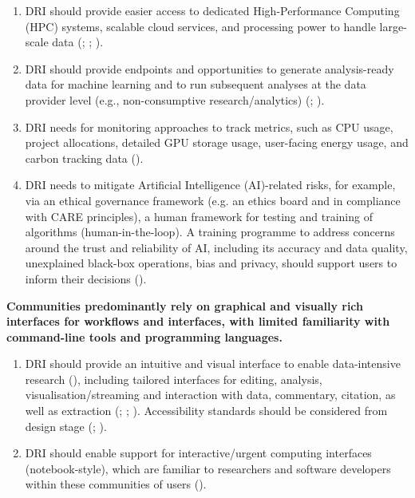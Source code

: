 \documentclass[11pt]{scrartcl}
\begin{document}
\begin{enumerate}[resume]
\item\label{itm:hpc} DRI should provide easier access to dedicated High-Performance Computing (HPC) systems, scalable cloud services, and processing power to handle large-scale data
(\cite[62]{de_roure_2022_4716148}; \cite[2]{bell_2025_17099176}; 
\cite[72]{shoaib_sufi_2023_7686348}).   

\item\label{itm:ana} DRI should provide endpoints and opportunities to generate analysis-ready data for machine learning and to run subsequent analyses at the data provider level (e.g., non-consumptive research/analytics) 
(\cite[4,66]{de_roure_2022_4716148}; \cite[5]{wrro203045}).

\item DRI needs for monitoring approaches to track metrics, such as CPU usage, project allocations, detailed GPU storage usage, user-facing energy usage, and carbon tracking data 
(\cite[14,15]{collier25}).  

\item\label{itm:aigov} DRI needs to mitigate Artificial Intelligence (AI)-related risks, for example, via an ethical governance framework (e.g. an ethics board and in compliance with CARE principles), a human framework for testing and training of algorithms (human-in-the-loop). A training programme to address concerns around the trust and reliability of AI, including its accuracy and data quality, unexplained black-box operations, bias and privacy, should support users to inform their decisions (\cite[4]{Zwiggelaar22}).   
\end{enumerate}

\noindent\textbf{Communities predominantly rely on graphical and visually rich interfaces for workflows and interfaces, with limited familiarity with command-line tools and programming languages.}

\begin{enumerate}[resume]
\item DRI should provide an intuitive and visual interface to enable data-intensive research 
(\cite[4]{wrro203045}), 
including tailored interfaces for editing, analysis, visualisation/streaming and interaction with data, commentary, citation, as well as extraction (\cite{Rodriguez22}; \cite[44]{de_roure_2022_4716148}; \cite[5]{wrro203045}). 
Accessibility standards should be considered from design stage
(\cite[66]{de_roure_2022_4716148}; \cite[5]{wrro203045}).  

\item DRI should enable support for interactive/urgent computing interfaces (notebook-style), which are familiar to researchers and software developers within these communities of users (\cite[4]{bell_2025_17099176}). 
\end{enumerate}
\end{document}
